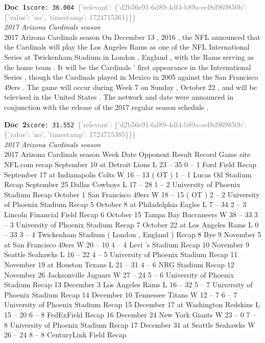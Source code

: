 \documentclass[a4paper,11pt]{article}
\begin{document}
\begin{docenv}
{\footnotesize\textcolor{doccolor}{\textbf{Doc~1}}}\hfill{\tiny\texttt{score:~36.004}}\ {\tiny\textcolor{gray}{\{'relevant': \{'d2b56e91-6d89-4df4-b89a-eef8d969850b': \{'value': 'no', 'timestamp': 1724715361\}\}\}}}\\[3pt]
{\small\textit{2017 Arizona Cardinals season}}\\[2pt]
\vspace{2pt}
{\footnotesize 2017 Arizona Cardinals season
On December 13 , 2016 , the NFL announced that the Cardinals will play the Los Angeles Rams as one of the NFL International Series at Twickenham Stadium in London , England , with the Rams serving as the home team . It will be the Cardinals ' first appearance in the International Series , though the Cardinals played in Mexico in 2005 against the San Francisco 49ers . The game will occur during Week 7 on Sunday , October 22 , and will be televised in the United States . The network and date were announced in conjunction with the release of the 2017 regular season schedule .}
\end{docenv}
\begin{docenv}
{\footnotesize\textcolor{doccolor}{\textbf{Doc~2}}}\hfill{\tiny\texttt{score:~31.552}}\ {\tiny\textcolor{gray}{\{'relevant': \{'d2b56e91-6d89-4df4-b89a-eef8d969850b': \{'value': 'no', 'timestamp': 1724715385\}\}\}}}\\[3pt]
{\small\textit{2017 Arizona Cardinals season}}\\[2pt]
\vspace{2pt}
{\footnotesize 2017 Arizona Cardinals season
Week Date Opponent Result Record Game site NFL.com recap September 10 at Detroit Lions L 23 -- 35 0 -- 1 Ford Field Recap September 17 at Indianapolis Colts W 16 -- 13 ( OT ) 1 -- 1 Lucas Oil Stadium Recap September 25 Dallas Cowboys L 17 -- 28 1 -- 2 University of Phoenix Stadium Recap October 1 San Francisco 49ers W 18 -- 15 ( OT ) 2 -- 2 University of Phoenix Stadium Recap 5 October 8 at Philadelphia Eagles L 7 -- 34 2 -- 3 Lincoln Financial Field Recap 6 October 15 Tampa Bay Buccaneers W 38 -- 33 3 -- 3 University of Phoenix Stadium Recap 7 October 22 at Los Angeles Rams L 0 -- 33 3 -- 4 Twickenham Stadium ( London , England ) Recap 8 Bye 9 November 5 at San Francisco 49ers W 20 -- 10 4 -- 4 Levi 's Stadium Recap 10 November 9 Seattle Seahawks L 16 -- 22 4 -- 5 University of Phoenix Stadium Recap 11 November 19 at Houston Texans L 21 -- 31 4 -- 6 NRG Stadium Recap 12 November 26 Jacksonville Jaguars W 27 -- 24 5 -- 6 University of Phoenix Stadium Recap 13 December 3 Los Angeles Rams L 16 -- 32 5 -- 7 University of Phoenix Stadium Recap 14 December 10 Tennessee Titans W 12 -- 7 6 -- 7 University of Phoenix Stadium Recap 15 December 17 at Washington Redskins L 15 -- 20 6 -- 8 FedExField Recap 16 December 24 New York Giants W 23 -- 0 7 -- 8 University of Phoenix Stadium Recap 17 December 31 at Seattle Seahawks W 26 -- 24 8 -- 8 CenturyLink Field Recap}
\end{docenv}
\end{document}
